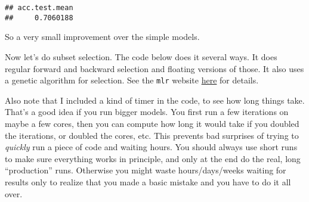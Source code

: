 \documentclass[]{article}
\begin{document}
\begin{verbatim}
## acc.test.mean 
##     0.7060188
\end{verbatim}

So a very small improvement over the simple models.

Now let's do subset selection. The code below does it several ways. It
does regular forward and backward selection and floating versions of
those. It also uses a genetic algorithm for selection. See the
\texttt{mlr} website
\href{https://mlr.mlr-org.com/articles/tutorial/feature_selection.html}{here}
for details.

Also note that I included a kind of timer in the code, to see how long
things take. That's a good idea if you run bigger models. You first run
a few iterations on maybe a few cores, then you can compute how long it
would take if you doubled the iterations, or doubled the cores, etc.
This prevents bad surprises of trying to \emph{quickly} run a piece of
code and waiting hours. You should always use short runs to make sure
everything works in principle, and only at the end do the real, long
``production'' runs. Otherwise you might waste hours/days/weeks waiting
for results only to realize that you made a basic mistake and you have
to do it all over.
\end{document}
